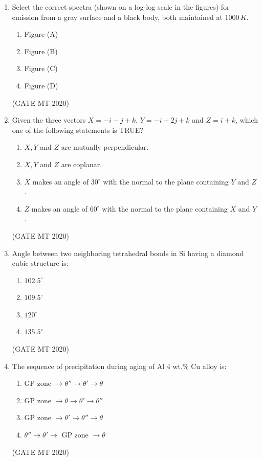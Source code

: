 \documentclass[journal, 11pt, onecolumn]{IEEEtran}
\theoremstyle{remark}
\begin{document}
\begin{enumerate}
\item Select the correct spectra (shown on a log-log scale in the figures) for emission from a gray surface and a black body, both maintained at $1000 \, K$.
\begin{enumerate}
\item Figure (A)  
\item Figure (B)  
\item Figure (C)  
\item Figure (D)  
\end{enumerate}
\hfill(GATE MT 2020)


\item Given the three vectors $X = -i - j + k$, $Y = -i + 2j + k$ and $Z = i + k$, which one of the following statements is TRUE?
\begin{enumerate}
\item $X, Y$ and $Z$ are mutually perpendicular.  
\item $X, Y$ and $Z$ are coplanar.  
\item $X$ makes an angle of $30^\circ$ with the normal to the plane containing $Y$ and $Z$.  
\item $Z$ makes an angle of $60^\circ$ with the normal to the plane containing $X$ and $Y$.  
\end{enumerate}
\hfill(GATE MT 2020)


\item Angle between two neighboring tetrahedral bonds in Si having a diamond cubic structure is:
\begin{enumerate}
\item $102.5^\circ$  
\item $109.5^\circ$  
\item $120^\circ$  
\item $135.5^\circ$  
\end{enumerate}
\hfill(GATE MT 2020)


\item The sequence of precipitation during aging of Al 4 wt.\% Cu alloy is:
\begin{enumerate}
\item GP zone $\rightarrow \theta'' \rightarrow \theta' \rightarrow \theta$  
\item GP zone $\rightarrow \theta \rightarrow \theta' \rightarrow \theta''$  
\item GP zone $\rightarrow \theta' \rightarrow \theta'' \rightarrow \theta$  
\item $\theta'' \rightarrow \theta' \rightarrow$ GP zone $\rightarrow \theta$  
\end{enumerate}
\hfill(GATE MT 2020)



\end{enumerate}
\end{document}
